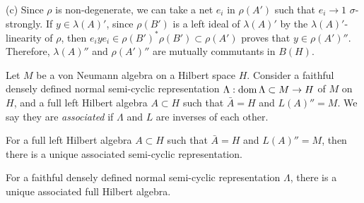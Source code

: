 \documentclass{../../large}
\begin{document}
\begin{pf}
(c)
Since $\rho$ is non-degenerate, we can take a net $e_i$ in $\rho(A')$ such that $e_i\to1$ $\sigma$-strongly.
If $y\in\lambda(A)'$, since $\rho(B')$ is a left ideal of $\lambda(A)'$ by the $\lambda(A)'$-linearity of $\rho$, then $e_iye_i\in\rho(B')^*\rho(B')\subset\rho(A')$ proves that $y\in\rho(A')''$.
Therefore, $\lambda(A)''$ and $\rho(A')''$ are mutually commutants in $B(H)$.
\end{pf}



\begin{prb}
Let $M$ be a von Neumann algebra on a Hilbert space $H$.
Consider a faithful densely defined normal semi-cyclic representation $\Lambda:\operatorname{dom}\Lambda\subset M\to H$ of $M$ on $H$, and a full left Hilbert algebra $A\subset H$ such that $\bar A=H$ and $L(A)''=M$.
We say they are \emph{associated} if $\Lambda$ and $L$ are inverses of each other.

\begin{parts}
\item For a full left Hilbert algebra $A\subset H$ such that $\bar A=H$ and $L(A)''=M$, then there is a unique associated semi-cyclic representation.
\item For a faithful densely defined normal semi-cyclic representation $\Lambda$, there is a unique associated full Hilbert algebra.
\end{parts}
\end{prb}
\end{document}
